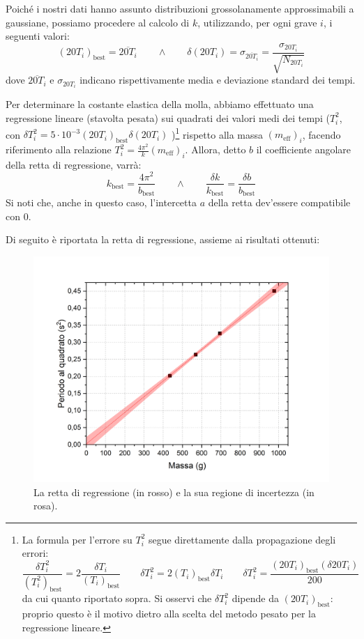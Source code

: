 \documentclass{article}
\begin{document}
Poiché i nostri dati hanno assunto distribuzioni grossolanamente
approssimabili a gaussiane, possiamo procedere al calcolo di $k$,
utilizzando, per ogni grave $i$, i seguenti valori:
\[
    \left(20T_i\right)_\text{best} = \overline{20T_i}
    \qquad\wedge\qquad
    \delta\left(20T_i\right) =
    \sigma_{\overline{20T_i}} =
    \frac{\sigma_{20T_i}}{\sqrt{N_{20T_i}}}
\]
dove $\overline{20T_i}$ e $\sigma_{20T_i}$ indicano rispettivamente
media e deviazione standard dei tempi.

Per determinare la costante elastica della molla, abbiamo effettuato
una regressione lineare (stavolta pesata) sui quadrati dei valori medi
dei tempi ($T_i^2$, con
$\delta T_i^2 = 5 \cdot 10^{-3} (20 T_i)_\text{best} \delta(20 T_i)$
)\footnote[2]{
    La formula per l'errore su $T_i^2$ segue direttamente dalla
    propagazione degli errori:
    \[
        \frac{\delta T_i^2}{\left(T_i^2\right)_\text{best}} = 2\frac{\delta T_i}{{\left(T_i\right)}_\text{best}}
        \qquad
        \delta T_i^2 = 2\left(T_i\right)_\text{best}\delta T_i
        \qquad
        \delta T_i^2 = \frac{\left(20T_i\right)_\text{best}(\delta 20T_i)}{200}
    \]
    da cui quanto riportato sopra.
    Si osservi che $\delta T_i^2$ dipende da
    $\left(20T_i\right)_\text{best}$:
    proprio questo è il motivo dietro alla scelta del metodo pesato
    per la regressione lineare.
} rispetto alla massa $\left(m_\text{eff}\right)_i$, facendo riferimento
alla relazione $T_i^2 = \frac{4\pi^2}{k} \left(m_\text{eff}\right)_i$. Allora, detto $b$ il
coefficiente angolare della retta di regressione, varrà:
\[
    k_\text{best}=\frac{4\pi^2}{b_\text{best}}
    \qquad\wedge\qquad
    \frac{\delta k}{k_\text{best}}=\frac{\delta b}{b_\text{best}}
\]
Si noti che, anche in questo caso, l'intercetta $a$ della retta dev'essere
compatibile con $0$.

Di seguito è riportata la retta di regressione, assieme ai risultati ottenuti:

\begin{figure}[H]
    \includegraphics[trim={0 1.8cm 0 0},width=\textwidth]{DinamicoReg.jpg}
    \caption{
        La retta di regressione (in rosso)
        e la sua regione di incertezza (in rosa).
    }
\end{figure}
\end{document}
